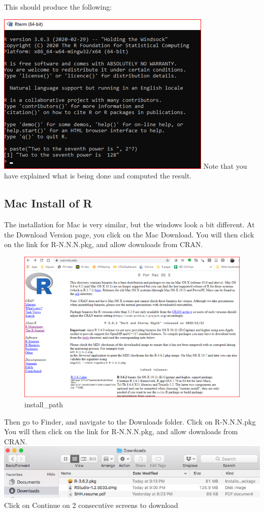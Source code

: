 \documentclass[
]{book}
\begin{document}
This should produce the following:

\includegraphics{images/windowstest.png}
Note that you have explained what is being done and computed the result.

\hypertarget{mac-install-of-r}{%
\subsection{Mac Install of R}\label{mac-install-of-r}}

The installation for Mac is very similar, but the windows look a bit different. At the Download Version page, you click on the Mac Download.
You will then click on the link for R-N.N.N.pkg, and allow downloads from CRAN.

\begin{figure}
\centering
\includegraphics{images/installrpkgmac.png}
\caption{install\_path}
\end{figure}

Then go to Finder, and navigate to the Downloads folder. Click on R-N.N.N.pkg
You will then click on the link for R-N.N.N.pkg, and allow downloads from CRAN.
\includegraphics{images/installrdownloadsmac.png}
Click on Continue on 2 consecutive screens to download
\end{document}
